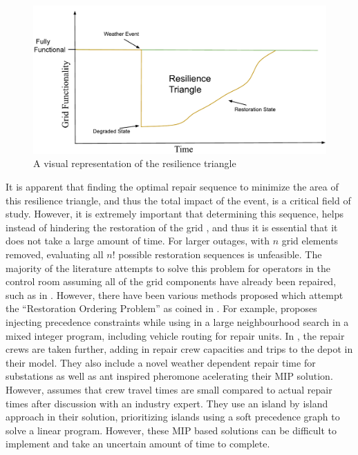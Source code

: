 \documentclass[12pt]{article}
\begin{document}
\begin{figure}[ht]
    \centering %
    \includegraphics[width=\textwidth]{Resilience Triangle.pdf}
    \caption[Resilience Triangle]{A visual representation of the resilience triangle}
    \label{fig:resiliencetriangle}
\end{figure}
It is apparent that finding the optimal repair sequence to minimize the area of this resilience triangle, and thus the total impact of the event, is a critical field of study. However, it is extremely important that determining this sequence, helps instead of hindering the restoration of the grid \cite{ancona},  and thus it is essential that it does not take a large amount of time. For larger outages, with $n$ grid elements removed, evaluating all $n!$ possible restoration sequences is unfeasible. The majority of the literature attempts to solve this problem for operators in the control room \cite{yan} assuming all of the grid components have already been repaired, such as in \cite{chen}\cite{thiebaux}.  However, there have been various methods proposed which attempt the “Restoration Ordering Problem” as coined in \cite{coffrin2012}. For example, \cite{coffrin2011} proposes injecting precedence constraints while using in a large neighbourhood search in a mixed integer program, including vehicle routing for repair units. In \cite{yan}, the repair crews are taken further, adding in repair crew capacities and trips to the depot in their model. They also include a novel weather dependent repair time for substations as well as ant inspired pheromone acelerating their MIP solution. However, \cite{tan} assumes that crew travel times are small compared to actual repair times after discussion with an industry expert. They use an island by island approach in their solution, prioritizing islands using a soft precedence graph to solve a linear program. However, these MIP based solutions can be difficult to implement and take an uncertain amount of time to complete. \par
\end{document}
